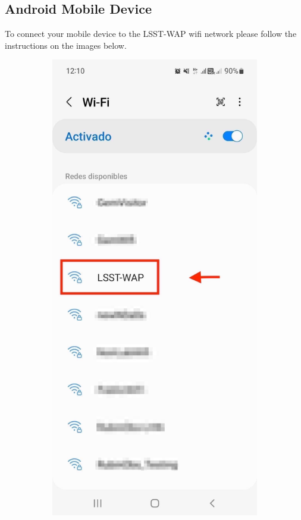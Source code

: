   \subsection{Android Mobile Device}
  To connect your mobile device to the LSST-WAP wifi network please follow the instructions on the images below. 
  \begin{figure}
    \centering
    \begin{subfigure}{0.4\textwidth}
      \includegraphics[width=\textwidth]{Images/Android1.png}

\end{subfigure}
\end{figure}
